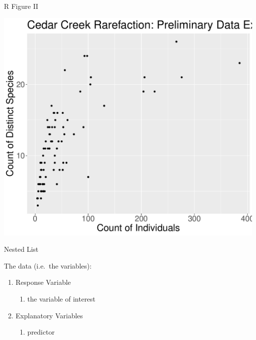\documentclass[
  ignorenonframetext,
]{beamer}
\begin{document}
\begin{frame}{R Figure II}
\protect\hypertarget{r-figure-ii}{}

\includegraphics{slide_element_templates_files/figure-beamer/r figure set height and width-1.pdf}

\end{frame}

\begin{frame}{Nested List}
\protect\hypertarget{nested-list}{}

The data (i.e.~the variables):

\begin{enumerate}
  \item Response Variable
  \begin{enumerate}
    \item the variable of interest
  \end{enumerate}
  \item Explanatory Variables
  \begin{enumerate}
    \item predictor
  \end{enumerate}
\end{enumerate}

\end{frame}
\end{document}
